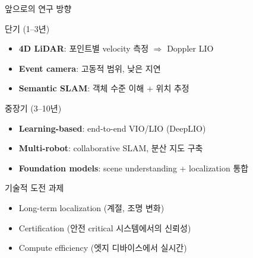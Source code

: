 \begin{frame}[shrink=15]{앞으로의 연구 방향}
  \begin{block}{단기 (1--3년)}
    \begin{itemize}
      \item \textbf{4D LiDAR}: 포인트별 velocity 측정 $\Rightarrow$ Doppler LIO
      \item \textbf{Event camera}: 고동적 범위, 낮은 지연
      \item \textbf{Semantic SLAM}: 객체 수준 이해 + 위치 추정
    \end{itemize}
  \end{block}
  \pause
  \begin{block}{중장기 (3--10년)}
    \begin{itemize}
      \item \textbf{Learning-based}: end-to-end VIO/LIO (DeepLIO)
      \item \textbf{Multi-robot}: collaborative SLAM, 분산 지도 구축
      \item \textbf{Foundation models}: scene understanding + localization 통합
    \end{itemize}
  \end{block}
  \pause
  \begin{exampleblock}{기술적 도전 과제}
    \begin{itemize}
      \item Long-term localization (계절, 조명 변화)
      \item Certification (안전 critical 시스템에서의 신뢰성)
      \item Compute efficiency (엣지 디바이스에서 실시간)
    \end{itemize}
  \end{exampleblock}
\end{frame}

